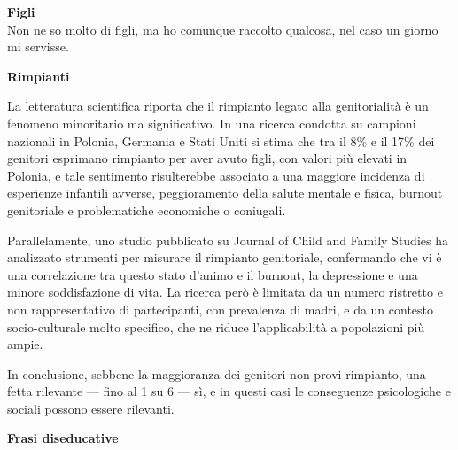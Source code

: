 \documentclass[12pt]{book} %
\begin{document}
\noindent \textbf{\large Figli} \\
Non ne so molto di figli, ma ho comunque raccolto qualcosa, nel caso un giorno mi servisse.

\textbf{Rimpianti}

La letteratura scientifica riporta che il rimpianto legato alla genitorialità è un fenomeno minoritario ma significativo. In una ricerca condotta su campioni nazionali in Polonia, Germania e Stati Uniti si stima che tra il 8\% e il 17\% dei genitori esprimano rimpianto per aver avuto figli, con valori più elevati in Polonia, e tale sentimento risulterebbe associato a una maggiore incidenza di esperienze infantili avverse, peggioramento della salute mentale e fisica, burnout genitoriale e problematiche economiche o coniugali.

Parallelamente, uno studio pubblicato su Journal of Child and Family Studies ha analizzato strumenti per misurare il rimpianto genitoriale, confermando che vi è una correlazione tra questo stato d’animo e il burnout, la depressione e una minore soddisfazione di vita. La ricerca però è limitata da un numero ristretto e non rappresentativo di partecipanti, con prevalenza di madri, e da un contesto socio-culturale molto specifico, che ne riduce l’applicabilità a popolazioni più ampie.

In conclusione, sebbene la maggioranza dei genitori non provi rimpianto, una fetta rilevante — fino al 1 su 6 — sì, e in questi casi le conseguenze psicologiche e sociali possono essere rilevanti.  

\textbf{Frasi diseducative}
\end{document}

